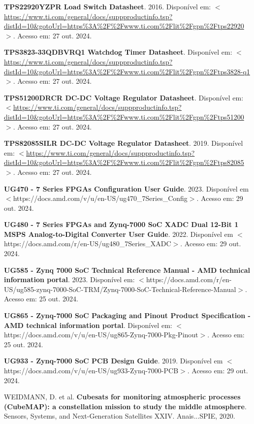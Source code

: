 \begin{flushleft}
\begin{thebibliography}{00}
 \textbf{TPS22920YZPR Load Switch Datasheet}. 2016. Disponível em: $<$\url{https://www.ti.com/general/docs/suppproductinfo.tsp?distId=10\&gotoUrl=https\%3A\%2F\%2Fwww.ti.com\%2Flit\%2Fgpn\%2Ftps22920}$>$. Acesso em: 27 out. 2024. 

 \textbf{TPS3823-33QDBVRQ1 Watchdog Timer Datasheet}. Disponível em: $<$\url{https://www.ti.com/general/docs/suppproductinfo.tsp?distId=10\&gotoUrl=https\%3A\%2F\%2Fwww.ti.com\%2Flit\%2Fgpn\%2Ftps3828-q1}$>$. Acesso em: 27 out. 2024. 

 \textbf{TPS51200DRCR DC-DC Voltage Regulator Datasheet}. Disponível em: $<$\url{https://www.ti.com/general/docs/suppproductinfo.tsp?distId=10\&gotoUrl=https\%3A\%2F\%2Fwww.ti.com\%2Flit\%2Fgpn\%2Ftps51200}$>$. Acesso em: 27 out. 2024. 

 \textbf{TPS82085SILR DC-DC Voltage Regulator Datasheet}. 2019. Disponível em: $<$\url{https://www.ti.com/general/docs/suppproductinfo.tsp?distId=10\&gotoUrl=https\%3A\%2F\%2Fwww.ti.com\%2Flit\%2Fgpn\%2Ftps82085}$>$. Acesso em: 27 out. 2024. 

 \textbf{UG470 - 7 Series FPGAs Configuration User Guide}. 2023. Disponível em $<$https://docs.amd.com/v/u/en-US/ug470\_7Series\_Config$>$. Acesso em: 29 out. 2024.

 \textbf{UG480 - 7 Series FPGAs and Zynq-7000 SoC XADC Dual 12-Bit 1 MSPS Analog-to-Digital Converter User Guide}. 2022. Disponível em $<$https://docs.amd.com/r/en-US/ug480\_7Series\_XADC$>$. Acesso em: 29 out. 2024.

 \textbf{UG585 - Zynq 7000 SoC Technical Reference Manual - AMD technical information portal}. 2023. Disponível em: $<$https://docs.amd.com/r/en-US/ug585-zynq-7000-SoC-TRM/Zynq-7000-SoC-Technical-Reference-Manual$>$. Acesso em: 25 out. 2024.

 \textbf{UG865 - Zynq-7000 SoC Packaging and Pinout Product Specification - AMD technical information portal}. Disponível em: $<$https://docs.amd.com/v/u/en-US/ug865-Zynq-7000-Pkg-Pinout$>$. Acesso em: 25 out. 2024.

 \textbf{UG933 - Zynq-7000 SoC PCB Design Guide}. 2019. Disponível em $<$https://docs.amd.com/v/u/en-US/ug933-Zynq-7000-PCB$>$. Acesso em: 29 out. 2024.

 WEIDMANN, D. et al. \textbf{Cubesats for monitoring atmospheric processes (CubeMAP): a constellation mission to study the middle atmosphere}. Sensors, Systems, and Next-Generation Satellites XXIV. Anais...SPIE, 2020.


\end{thebibliography}
\end{flushleft}
